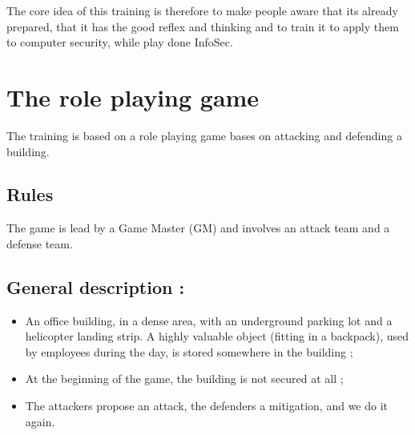 \documentclass[11pt]{article} %
\begin{document}
The core idea of this training is therefore to make people aware
that its already prepared, that it has the good reflex and
thinking and to train it to apply them to computer security,
while play done InfoSec.


\section{The role playing game}
The training is based on a role playing game bases on attacking and defending a building.


\subsection{Rules}
The game is lead by a Game Master (GM) and involves an attack team and a defense team.

\subsection{General description : }

\begin{itemize} 
\item An office building, in a dense area, with
an underground parking lot and a helicopter landing strip. A
highly valuable object (fitting in a backpack), used by
employees during the day, is stored somewhere in the building ;
\item At the beginning of the game, the building is not secured
at all ; 
\item The attackers propose an attack, the defenders a
mitigation, and we do it again.
\end{itemize}
\end{document}
